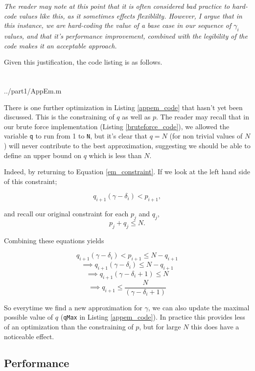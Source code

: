 \documentclass[10pt]{article}
\newcommand*{\gam}{$\gamma$}
\newcommand*{\gami}{$\gamma_{i}$}
\begin{document}
\emph{The reader may note at this point that it is often considered bad practice to hard-code values like this, as it sometimes effects flexiblilty. However, I argue that in this instance, we are hard-coding the value of a base case in our sequence of \gami $ $ values, and that it's performance improvement, combined with the legibility of the code makes it an acceptable approach.}

Given this justification, the code listing is as follows. \\ \\ \\

   {../part1/AppEm.m}

There is one further optimization in Listing \ref{appem_code} that hasn't yet been discussed. This is the constraining of $q$ as well as $p$. The reader may recall that in our brute force implementation (Listing \ref{bruteforce_code}), we allowed the variable \texttt{q} to run from 1 to \texttt{N}, but it's clear that $q = N$ (for non trivial values of $N$) will never contribute to the best approximation, suggesting we should be able to define an upper bound on $q$ which is less than $N$.

Indeed, by returning to Equation \ref{em_constraint}. If we look at the left hand side of this constraint;

$$q_{i+1} (\gamma - \delta_i) < p_{i+1} ,$$

and recall our original constraint for each $p_j$ and $q_j$,
$$ p_j + q_j \leq N .$$

Combining these equations yields

$$ q_{i+1} (\gamma - \delta_i) < p_{i+1} \leq N - q_{i+1}$$ 
$$ \implies  q_{i+1} (\gamma - \delta_i) \leq N - q_{i+1} $$ 
$$ \implies q_{i+1} (\gamma - \delta_i + 1) \leq N  $$ 
$$ \implies q_{i+1}  \leq \frac{N}{(\gamma - \delta_i + 1)}  $$ 

So everytime we find a new approximation for \gam, we can also update the maximal possible value of $q$ (\texttt{qMax} in Listing \ref{appem_code}). In practice this provides less of an optimization than the constraining of $p$, but for large $N$ this does have a noticeable effect.

\subsection{Performance}
\end{document}
